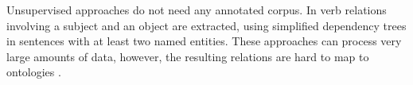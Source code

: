Unsupervised approaches do not need any annotated corpus. In \citep{Eichler2008} verb relations involving a subject and an object are extracted, using simplified dependency trees in sentences with at least two named entities. These approaches can process very large amounts of data, however, the resulting relations are hard to map to ontologies \citep{Augenstein2014}.

